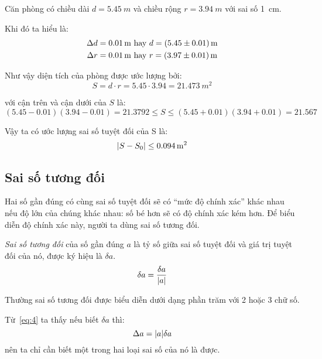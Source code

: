 \documentclass[../../Lectures.tex]{subfiles}
\begin{document}
\begin{exmp}\label{exmp:room_example}
    Căn phòng có chiều dài \(d = \SI{5.45}{m}\) và chiều rộng \(r =
    \SI{3.94}{m}\) với sai số \SI{1}{cm}.

    Khi đó ta hiểu là:
    \begin{gather*}
        \Delta d = \SI{0.01}{m} \text{ hay } d = \SI[separate-uncertainty=true]{5.45 \pm 0.01}{m} \\
        \Delta r = \SI{0.01}{m} \text{ hay } r = \SI[separate-uncertainty=true]{3.97 \pm 0.01}{m}
    \end{gather*}

    Như vậy diện tích của phòng được ước lượng bởi:
    \[S = d \cdot r = \num{5.45} \cdot \num{3.94} = \SI{21.473}{m^2}\]

    với cận trên và cận dưới của \(S\) là:
    \[(\num{5.45} - \num{0.01})(\num{3.94} - \num{0.01}) = \num{21.3792} \leq S \leq (\num{5.45} + \num{0.01})(\num{3.94} + \num{0.01}) = \num{21.567}\]

    Vậy ta có ước lượng sai số tuyệt đối của S là:
    \[\lvert S - S_0\rvert \leq \SI{0.094}{m^2}\]
\end{exmp}

\subsection{Sai số tương đối}

Hai số gần đúng có cùng sai số tuyệt đối sẽ có ``mức độ chính xác'' khác nhau nếu
độ lớn của chúng khác nhau: số bé hơn sẽ có độ chính xác kém hơn. Để biểu diễn
độ chính xác này, người ta dùng sai số tương đối.

\begin{definition}
    \emph{Sai số tương đối} của số gần đúng \(a\) là tỷ số giữa sai số tuyệt đối
    và giá trị tuyệt đối của nó, được ký hiệu là \(\delta a\).
    \begin{equation} \label{eq:4}
        \delta a = \frac{\delta a}{\lvert a\rvert}
    \end{equation}
\end{definition}

Thường sai số tương đối được biểu diễn dưới dạng phần trăm với 2 hoặc 3 chữ số.

Từ~\ref{eq:4} ta thấy nếu biết \(\delta a\) thì:
\begin{equation} \label{eq:5}
    \Delta a = \lvert a\rvert\delta a
\end{equation}
nên ta chỉ cần biết một trong hai loại sai số của nó là được.
\end{document}
